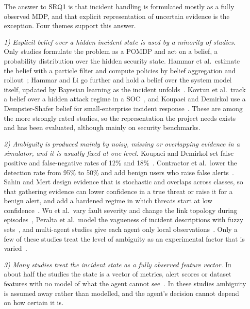 The answer to SRQ1 is that incident handling is formulated mostly as a fully observed MDP, and that explicit representation of uncertain evidence is the exception. Four themes support this answer.

\emph{1) Explicit belief over a hidden incident state is used by a minority of studies.} Only \NBelief{} studies formulate the problem as a POMDP and act on a belief, a probability distribution over the hidden security state. Hammar et al.\ estimate the belief with a particle filter and compute policies by belief aggregation and rollout~\cite{hammar2026belief}; Hammar and Li go further and hold a belief over the system model itself, updated by Bayesian learning as the incident unfolds~\cite{hammar2025}. Kovtun et al.\ track a belief over a hidden attack regime in a SOC~\cite{kovtun2026}, and Koupaei and Demirkol use a Dempster-Shafer belief for small-enterprise incident response~\cite{koupaei2026}. These are among the more strongly rated studies, so the representation the project needs exists and has been evaluated, although mainly on security benchmarks.

\emph{2) Ambiguity is produced mainly by noisy, missing or overlapping evidence in a simulator, and it is usually fixed at one level.} Koupaei and Demirkol set false-positive and false-negative rates of 12\% and 18\%~\cite{koupaei2026}. Contractor et al.\ lower the detection rate from 95\% to 50\% and add benign users who raise false alerts~\cite{contractor2025}. Sahin and Mert design evidence that is stochastic and overlaps across classes, so that gathering evidence can lower confidence in a true threat or raise it for a benign alert, and add a hardened regime in which threats start at low confidence~\cite{sahin2026}. Wu et al.\ vary fault severity and change the link topology during episodes~\cite{wu2026}, Peralta et al.\ model the vagueness of incident descriptions with fuzzy sets~\cite{peralta2025}, and multi-agent studies give each agent only local observations~\cite{aenugu2026,ravi2025}. Only a few of these studies treat the level of ambiguity as an experimental factor that is varied~\cite{contractor2025,sahin2026,wu2026}.

\emph{3) Many studies treat the incident state as a fully observed feature vector.} In about half the studies the state is a vector of metrics, alert scores or dataset features with no model of what the agent cannot see~\cite{saeed2025,noorulhassan2026,alturkistani2022,bhosale2026,raj2026,nimmathi2026,yuan2026,babar2026,hughes2022,jaber2025,singh2026,ghanem2026,dunsin2025,wang2024mrca,ding2023}. In these studies ambiguity is assumed away rather than modelled, and the agent's decision cannot depend on how certain it is.

